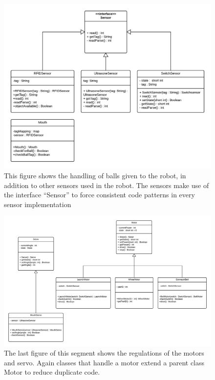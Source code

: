 \documentclass[11pt,twoside,a4paper]{report}
\begin{document}
\begin{figure}[!htb]
\begin{center}
\includegraphics[scale=0.40, angle=90]{Images/VolcanoBot-ObjectScanning.png}
\caption{This figure shows the handling of balls given to the robot, in addition to other sensors used in the robot. The sensors make use of the interface “Sensor” to force consistent code patterns in every sensor implementation
}
\label{fig:sensors}
\end{center}
\end{figure}
\begin{figure}[!htb]
\begin{center}
\includegraphics[scale=0.35, angle=90]{Images/VolcanoBot-Motors.png}
\caption{The last figure of this segment shows the regulations of the motors and servo. Again classes that handle a motor extend a parent class Motor to reduce duplicate code.}
\label{fig:motors}
\end{center}
\end{figure}
\end{document}
